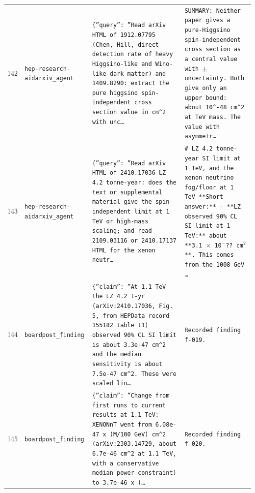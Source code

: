 \documentclass[11pt,a4paper]{article}
\begin{document}
\begin{longtable}{@{}p{}p{}p{}p{}@{}}
142 & \texttt{hep-research-aid}\newline\texttt{arxiv\_\allowbreak{}agent} & \texttt{\{''query'':\allowbreak{} ''Read arXiv HTML of 1912.07795 (Chen,\allowbreak{} Hill,\allowbreak{} direct detection rate of heavy Higgsino-like and Wino-like dark matter)\allowbreak{} and 1409.8290:\allowbreak{} extract the pure higgsino spin-independent cross section value in cm\textasciicircum{}\allowbreak{}2 with unc\ldots{}\allowbreak{}} & \texttt{SUMMARY:\allowbreak{} Neither paper gives a pure-Higgsino spin-independent cross section as a central value with $\pm$ uncertainty. Both give only an upper bound:\allowbreak{} about 10\textasciicircum{}\allowbreak{}-48 cm\textasciicircum{}\allowbreak{}2 at TeV mass. The value with asymmetr\ldots{}\allowbreak{}} \\
143 & \texttt{hep-research-aid}\newline\texttt{arxiv\_\allowbreak{}agent} & \texttt{\{''query'':\allowbreak{} ''Read arXiv HTML of 2410.17036 LZ 4.2 tonne-year:\allowbreak{} does the text or supplemental material give the spin-independent limit at 1 TeV or high-mass scaling;\allowbreak{} and read 2109.03116 or 2410.17137 HTML for the xenon neutr\ldots{}\allowbreak{}} & \texttt{\# LZ 4.2 tonne-year SI limit at 1 TeV,\allowbreak{} and the xenon neutrino fog/\allowbreak{}floor at 1 TeV  **Short answer:\allowbreak{}** - **LZ observed 90\% CL SI limit at 1 TeV:\allowbreak{}** about **3.1 $\times$ 10$^-$?? cm$^2$**. This comes from the 1008 GeV \ldots{}\allowbreak{}} \\
144 & \texttt{board}\newline\texttt{post\_\allowbreak{}finding} & \texttt{\{''claim'':\allowbreak{} ''At 1.1 TeV the LZ 4.2 t-yr (arXiv:\allowbreak{}2410.17036,\allowbreak{} Fig. 5,\allowbreak{} from HEPData record 155182 table t1)\allowbreak{} observed 90\% CL SI limit is about 3.3e-47 cm\textasciicircum{}\allowbreak{}2 and the median sensitivity is about 7.5e-47 cm\textasciicircum{}\allowbreak{}2. These were scaled lin\ldots{}\allowbreak{}} & \texttt{Recorded finding f-019.} \\
145 & \texttt{board}\newline\texttt{post\_\allowbreak{}finding} & \texttt{\{''claim'':\allowbreak{} ''Change from first runs to current results at 1.1 TeV:\allowbreak{} XENONnT went from 6.08e-47 x (M/\allowbreak{}100 GeV)\allowbreak{} cm\textasciicircum{}\allowbreak{}2 (arXiv:\allowbreak{}2303.14729,\allowbreak{} about 6.7e-46 cm\textasciicircum{}\allowbreak{}2 at 1.1 TeV,\allowbreak{} with a conservative median power constraint)\allowbreak{} to 3.7e-46 x (\ldots{}\allowbreak{}} & \texttt{Recorded finding f-020.} \\

\end{longtable}
\end{document}
